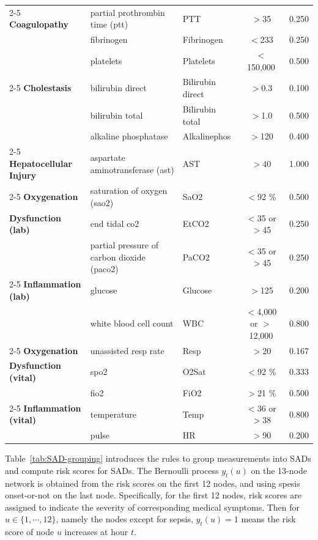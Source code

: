 \documentclass[11pt]{article}
\theoremstyle{remark}
\theoremstyle{plain}
\begin{document}
\begin{table}[t!]
\begin{center}
\begin{small}
{\begin{tabular}{lllcc}
	\cmidrule(l){2-5}
\textbf{Coagulopathy}	&	partial prothrombin time (ptt)	&	PTT	&	$>$35 	&	0.250	\\
	&	fibrinogen	&	Fibrinogen	&	$<$233	&	0.250	\\
	&	platelets	&	Platelets	&	$<$150,000	&	0.500	\\
	\cmidrule(l){2-5}
\textbf{Cholestasis}	&	bilirubin direct	&	Bilirubin direct	&	$>$0.3	&	0.100	\\
	&	bilirubin total	&	Bilirubin total	&	$>$1.0	&	0.500	\\
	&	alkaline phosphatase	&	Alkalinephos	&	$>$120	&	0.400	\\
	\cmidrule(l){2-5}
\textbf{Hepatocellular Injury}	&	aspartate aminotransferase (ast)	&	AST	&	$>$40	&	1.000	\\
	\cmidrule(l){2-5}
\textbf{Oxygenation }	 &	saturation of oxygen (sao2)	&	SaO2	&	$<$92 \%	&	0.500	\\
\textbf{Dysfunction (lab)}	 &	end tidal co2	&	EtCO2	&	$<$35 or $>$45	&	0.250	\\
	&	partial pressure of carbon dioxide (paco2)	&	PaCO2	&	$<$35 or $>$45	&	0.250	\\
	\cmidrule(l){2-5}
\textbf{Inflammation (lab)}	&	glucose	&	Glucose	&	$>$125	&	0.200	\\
	&	white blood cell count	&	WBC	&	$<$4,000 or $>$12,000	&	0.800	\\
	\cmidrule(l){2-5}
\textbf{Oxygenation }	&	unassisted resp rate	&	Resp	&	$>$20	&	0.167	\\
\textbf{Dysfunction (vital)}	&	spo2	&	O2Sat	&	$<$92 \%	&	0.333	\\
	&	fio2	&	FiO2	&	$>$21 \%	&	0.500	\\
	\cmidrule(l){2-5}
\textbf{Inflammation (vital)}	&	temperature	&	Temp	&	$<$36 or  $>$38	&	0.800	\\
	&	pulse	&	HR	&	$>$90	&	0.200	\\
\bottomrule[1pt]
\end{tabular}
}
\end{small}
\end{center}
\vspace{-0.25in}
\end{table}

Table~\ref{tab:SAD-grouping} introduces the rules to group measurements into SADs and compute risk scores for SADs. 
%
The Bernoulli process $y_t(u)$ on the 13-node network is obtained from the risk scores on the first 12 nodes, and using spesis onset-or-not on the last node.
Specifically, for the first 12 nodes, risk scores are assigned to indicate the severity of corresponding medical symptoms. Then for $u\in\{1,\cdots,12\}$, namely the nodes except for sepsis, $y_t(u)=1$ means the risk score of node $u$ increases at hour $t$. 
\end{document}
